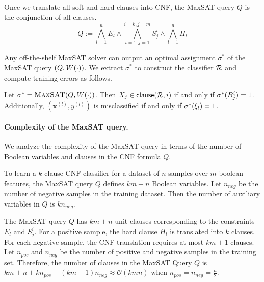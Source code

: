 Once we translate  all soft and hard clauses into CNF, the MaxSAT query $ Q $ is the conjunction of all clauses. 
\[
Q:= \bigwedge_{l=1}^n E_l \wedge  \bigwedge_{i=1,j=1}^{i=k,j=m} S_j^i \wedge \bigwedge_{l=1}^n H_l 
\]
		
Any off-the-shelf MaxSAT solver can output an optimal assignment $ \sigma^* $ of the MaxSAT query $ (Q, W \! \left( \cdot \right)) $. We extract $ \sigma^* $ to construct the classifier $ {\mathcal{R}} $ and compute training errors as follows.
\begin{construction}
	\label{interpretability_imli_construction:rule}
	Let $\sigma^* = \textsc{MaxSAT}(Q,W \! \left( \cdot \right))$. Then $X_j \in {\ensuremath{\mathsf{clause}}(\ensuremath{{\mathcal{R}}},i)}$ if and only if $\sigma^*(B_{j}^{i}) = 1$. Additionally, $ (\mathbf{x}^{(l)}, y^{(l)}) $ is misclassified if and only if $ \sigma^*(\xi_l) = 1 $.
\end{construction}




	
	
	 
\paragraph{Complexity of the MaxSAT query.}

We analyze the complexity of the MaxSAT query in terms of the number of Boolean variables and clauses in the CNF formula $ Q $. 

\begin{proposition}
	\label{interpretability_imli_prop:maxsat_variables}
	 To learn a $ k $-clause CNF classifier for a dataset of  $ n $ samples over $ m $ boolean features, the MaxSAT query $ Q $ defines $ km +n $ Boolean variables. Let $ n_{neg} $ be the number of negative samples in the training dataset. Then the number of auxiliary variables in $ Q $ is  $ kn_{neg}  $.
\end{proposition}


\begin{proposition}
	\label{interpretability_imli_prop:maxsat_clauses}
	The MaxSAT query $ Q $ has $ k m+n $ unit clauses corresponding to the constraints $ E_l $ and $ S_j^i $. For a positive sample, the hard clause $ H_l $ is translated into $ k $  clauses. For each negative sample, the CNF translation requires at most $ k m+1 $ clauses. Let $ n_{pos} $ and $ n_{neg} $ be the number of positive and negative samples in the training set. Therefore, the number of clauses in the MaxSAT Query $ Q $ is $ k m+n+k n_{pos}+(k m+1)n_{neg} \approx \mathcal{O}(k m  n ) $ when $ n_{pos}= n_{neg} =\frac{n}{2} $. 
\end{proposition}

